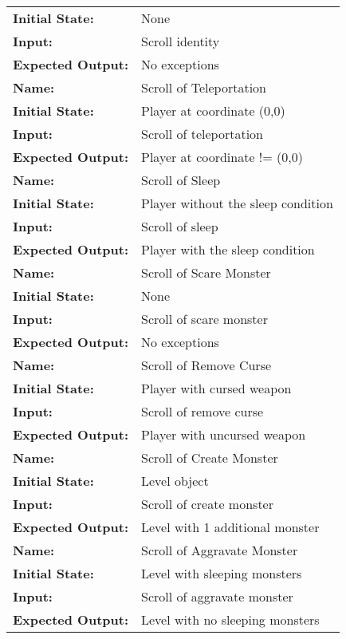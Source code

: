 \documentclass[12pt, titlepage]{article}
\begin{document}
\begin{center}
\begin{longtable}{ l | p{10cm} }
				\textbf{Initial State:} & None\\
				\textbf{Input:} & Scroll identity\\
				\textbf{Expected Output:} & No exceptions\\[0.6em]
				\hline
				\rule{0pt}{1.5em}\textbf{Name:} & Scroll of Teleportation\\
				\textbf{Initial State:} & Player at coordinate (0,0)\\
				\textbf{Input:} & Scroll of teleportation\\
				\textbf{Expected Output:} & Player at coordinate != (0,0)\\[0.6em]
				\hline
				\rule{0pt}{1.5em}\textbf{Name:} & Scroll of Sleep\\
				\textbf{Initial State:} & Player without the sleep condition\\
				\textbf{Input:} & Scroll of sleep\\
				\textbf{Expected Output:} & Player with the sleep condition\\[0.6em]
				\hline
				\rule{0pt}{1.5em}\textbf{Name:} & Scroll of Scare Monster\\
				\textbf{Initial State:} & None\\
				\textbf{Input:} & Scroll of scare monster\\
				\textbf{Expected Output:} & No exceptions\\[0.6em]
				\hline
				\rule{0pt}{1.5em}\textbf{Name:} & Scroll of Remove Curse\\
				\textbf{Initial State:} & Player with cursed weapon\\
				\textbf{Input:} & Scroll of remove curse\\
				\textbf{Expected Output:} & Player with uncursed weapon\\[0.6em]
				\hline
				\rule{0pt}{1.5em}\textbf{Name:} & Scroll of Create Monster\\
				\textbf{Initial State:} & Level object\\
				\textbf{Input:} & Scroll of create monster\\
				\textbf{Expected Output:} & Level with 1 additional monster\\[0.6em]
				\hline
				\rule{0pt}{1.5em}\textbf{Name:} & Scroll of Aggravate Monster\\
				\textbf{Initial State:} & Level with sleeping monsters\\
				\textbf{Input:} & Scroll of aggravate monster\\
				\textbf{Expected Output:} & Level with no sleeping monsters\\[0.6em]

\end{longtable}
\end{center}
\end{document}

